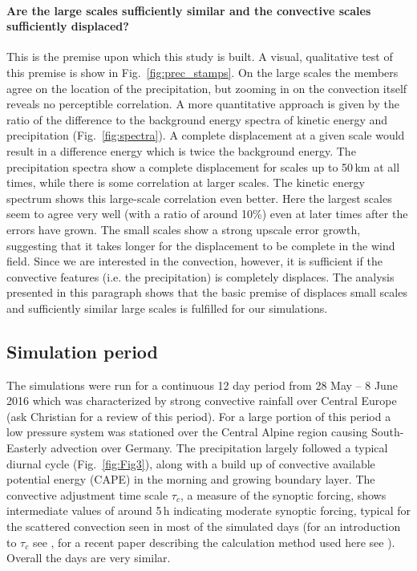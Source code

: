 \documentclass[a4paper, 12pt]{article}
\begin{document}
\paragraph{Are the large scales sufficiently similar and the convective scales sufficiently displaced?} This is the premise upon which this study is built. A visual, qualitative test of this premise is show in Fig.~\ref{fig:prec_stamps}. On the large scales the members agree on the location of the precipitation, but zooming in on the convection itself reveals no perceptible correlation. A more quantitative approach is given by the ratio of the difference to the background energy spectra of kinetic energy and precipitation (Fig.~\ref{fig:spectra}). A complete displacement at a given scale would result in a difference energy which is twice the background energy. The precipitation spectra show a complete displacement for scales up to 50\,km at all times, while there is some correlation at larger scales. The kinetic energy spectrum shows this large-scale correlation even better. Here the largest scales seem to agree very well (with a ratio of around 10\%) even at later times after the errors have grown. The small scales show a strong upscale error growth, suggesting that it takes longer for the displacement to be complete in the wind field. Since we are interested in the convection, however, it is sufficient if the convective features (i.e. the precipitation) is completely displaces. The analysis presented in this paragraph shows that the basic premise of displaces small scales and sufficiently similar large scales is fulfilled for our simulations. 



\subsection{Simulation period}
The simulations were run for a continuous 12 day period from 28 May -- 8 June 2016 which was characterized by strong convective rainfall over Central Europe (ask Christian for a review of this period). For a large portion of this period a low pressure system was stationed over the Central Alpine region causing South-Easterly advection over Germany. The precipitation largely followed a typical diurnal cycle (Fig.~\ref{fig:Fig3}), along with a build up of convective available potential energy (CAPE) in the morning and growing boundary layer. The convective adjustment time scale $\tau_c$, a measure of the synoptic forcing, shows intermediate values of around 5\,h indicating moderate synoptic forcing, typical for the scattered convection seen in most of the simulated days (for an introduction to $\tau_c$ see \cite{Done2006}, for a recent paper describing the calculation method used here see \cite{Flack2016}). Overall the days are very similar.
\end{document}
